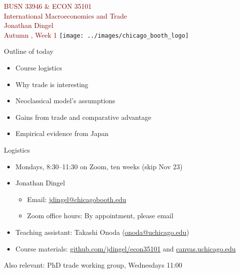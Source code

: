 \documentclass[10pt,notes=hide]{beamer}
\begin{document}
\begin{frame}[plain]
\begin{center}
\large
\textcolor{maroon}{BUSN 33946 \& ECON 35101\\
International Macroeconomics and Trade\\ 
Jonathan Dingel\\
Autumn \the\year, Week 1}
\vfill 
\texttt{[image: ../images/chicago\_booth\_logo]}
\end{center}
\end{frame}
\begin{frame}{Outline of today}
\begin{itemize}
	\item Course logistics
	\item Why trade is interesting
	\item Neoclassical model's assumptions
	\item Gains from trade and comparative advantage
	\item Empirical evidence from Japan
\end{itemize}
\end{frame}
\begin{frame}{Logistics}
\begin{itemize}
\item Mondays, 8:30--11:30 on Zoom, ten weeks (skip Nov 23)
\item Jonathan Dingel
\begin{itemize}
	\item Email: \href{mailto:jdingel@chicagobooth.edu}{jdingel@chicagobooth.edu}
	\item Zoom office hours: By appointment, please email
\end{itemize}
\item Teaching assistant: Takashi Onoda (\href{mailto:onoda@uchicago.edu}{onoda@uchicago.edu}) 
\item Course materials: \href{http://github.com/jdingel/econ35101}{github.com/jdingel/econ35101} and \href{https://canvas.uchicago.edu/courses/22781}{canvas.uchicago.edu}
\end{itemize}
\vspace{5mm}
Also relevant: PhD trade working group, Wednesdays 11:00 %
\end{frame}
\end{document}
